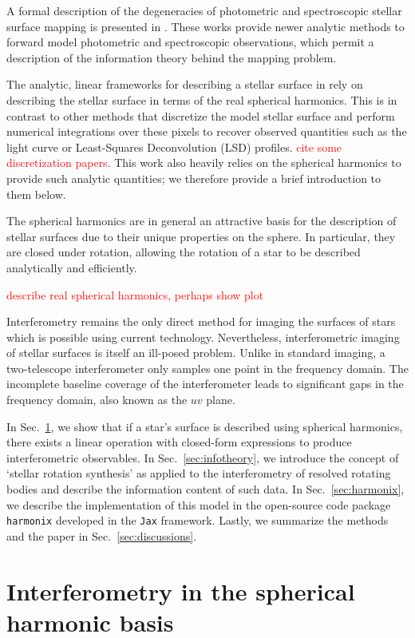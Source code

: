 \documentclass[modern]{aastex631}
\begin{document}
A formal description of the degeneracies of photometric and spectroscopic stellar surface mapping is presented in \citet{luger2021a, Luger2021b}. These works provide newer analytic methods to forward model photometric and spectroscopic observations, which permit a description of the information theory behind the mapping problem. 

The analytic, linear frameworks for describing a stellar surface in \citet{luger2021a, Luger2021b} rely on describing the stellar surface in terms of the real spherical harmonics. This is in contrast to other methods that discretize the model stellar surface and perform numerical integrations over these pixels to recover observed quantities such as the light curve or Least-Squares Deconvolution (LSD) profiles. \textcolor{red}{cite some discretization papers}. This work also heavily relies on the spherical harmonics to provide such analytic quantities; we therefore provide a brief introduction to them below. 

The spherical harmonics are in general an attractive basis for the description of stellar surfaces due to their unique properties on the sphere. In particular, they are closed under rotation, allowing the rotation of a star to be described analytically and efficiently. 

\textcolor{red}{describe real spherical harmonics, perhaps show plot}

Interferometry remains the only direct method for imaging the surfaces of stars which is possible using current technology. Nevertheless, interferometric imaging of stellar surfaces is itself an ill-posed problem. Unlike in standard imaging, a two-telescope interferometer only samples one point in the frequency domain. The incomplete baseline coverage of the interferometer leads to significant gaps in the frequency domain, also known as the $uv$ plane.

In Sec.~\ref{sec:maps}, we show that if a star's surface is described using spherical harmonics, there exists a linear operation with closed-form expressions to produce interferometric observables. In Sec.~\ref{sec:infotheory}, we introduce the concept of `stellar rotation synthesis' as applied to the interferometry of resolved rotating bodies and describe the information content of such data. In  Sec.~\ref{sec:harmonix}, we describe the implementation of this model in the open-source code package \texttt{harmonix} developed in the \texttt{Jax} framework. Lastly, we summarize the methods and the paper in Sec.~\ref{sec:discussions}.
\section{Interferometry in the spherical harmonic basis}
\label{sec:maps}
\end{document}
